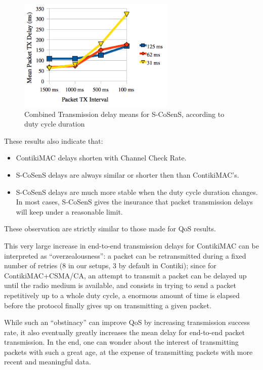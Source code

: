 \documentclass[a4paper,twoside]{article}
\begin{document}
\begin{figure}
  \centering
  \includegraphics[width=7.5cm]{graphes/DelaysStabilitySCoSenS.png}
  \caption{Combined Transmission delay means for S-CoSenS,
           according to duty cycle duration}
  \label{FigDelaysSCoSenS}
\end{figure}

These results also indicate that:

\begin{itemize}

\item ContikiMAC delays shorten with Channel Check Rate.

\item S-CoSenS delays are always similar or shorter then than ContikiMAC's.

\item S-CoSenS delays are much more stable when the duty cycle duration
      changes. In most cases, S-CoSenS gives the insurance that packet
      transmission delays will keep under a reasonable limit.

\end{itemize}

These observation are strictly similar to those made for QoS results.

This very large increase in end-to-end transmission delays for ContikiMAC
can be interpreted as ``overzealousness'': a packet can be retransmitted
during a fixed number of retries (8 in our setups, 3 by default in Contiki);
since for ContikiMAC+CSMA/CA, an attempt to transmit a packet can be delayed
up until the radio medium is available, and consists in trying to send
a packet repetitively up to a whole duty cycle, a enormous amount of time
is elapsed before the protocol finally gives up on transmitting a given
packet.

While such an ``obstinacy'' can improve QoS by increasing transmission
success rate, it also eventually greatly increases the mean delay for
end-to-end packet transmission. In the end, one can wonder about the
interest of transmitting packets with such a great age, at the expense
of transmitting packets with more recent and meaningful data.
\end{document}
